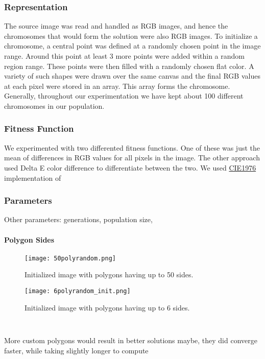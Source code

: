 \documentclass[11pt]{article}
\begin{document}
\subsubsection{Representation}
The source image was read and handled as RGB images, and hence the chromosomes that would form the solution were also RGB images. To initialize a chromosome, a central point was defined at a randomly chosen point in the image range. Around this point at least 3 more points were added within a random region range. These points were then filled with a randomly chosen flat color. A variety of such shapes were drawn over the same canvas and the final RGB values at each pixel were stored in an array.
This array forms the chromosome. Generally, throughout our experimentation we have kept about 100 different chromosomes in our population. 

\subsubsection{Fitness Function}
We experimented with two differented fitness functions. 
One of these was just the mean of differences in RGB values for all pixels in the image. 
The other approach used Delta E color difference to differentiate between the two. We used \href{https://colour.readthedocs.io/en/latest/colour.difference.html}{CIE1976} implementation of  
\subsubsection{Parameters}
Other parameters: generations, population size,
\paragraph{Polygon Sides}
\begin{figure}
    \centering
    \texttt{[image: 50polyrandom.png]}
    \caption{Initialized image with polygons having up to 50 sides.}
    \label{fig:50poly}
\end{figure}
\begin{figure}
    \centering
    \texttt{[image: 6polyrandom\_init.png]}
    \caption{Initialized image with polygons having up to 6 sides.}
    \label{fig:6poly}
\end{figure}
    \begin{verbatim}
        
    \end{verbatim}
More custom polygons would result in better solutions maybe, they did converge faster, while taking slightly longer to compute 
\end{document}
